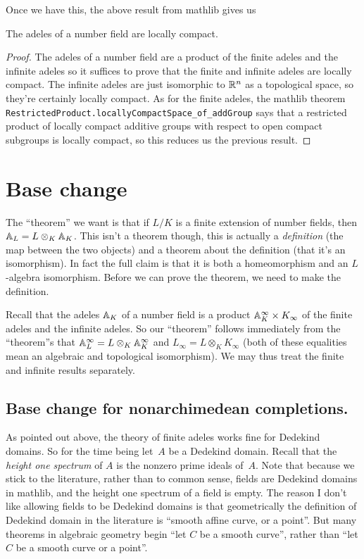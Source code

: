 Once we have this, the above result from mathlib gives us
\begin{theorem}
  \label{NumberField.AdeleRing.locallyCompactSpace}
  \leanok
  The adeles of a number field are locally compact.
\end{theorem}
\begin{proof}
  The adeles of a number field are a product of the finite adeles and the infinite adeles
  so it suffices to prove that the finite and infinite adeles are locally compact.
  The infinite adeles are just isomorphic to $\mathbb{R}^n$ as a topological space, so they're certainly
  locally compact. As for the finite adeles,
  the mathlib theorem {\tt RestrictedProduct.locallyCompactSpace\_of\_addGroup}
  says that a restricted product of locally compact additive groups with respect to open compact
  subgroups is locally compact, so this reduces us the previous result.
\end{proof}

\section{Base change}

The ``theorem'' we want is that if $L/K$ is a finite extension of number fields,
then $\mathbb{A}_L=L\otimes_K\mathbb{A}_K$. This isn't a theorem though, this is actually a \emph{definition}
(the map between the two objects) and a theorem about
the definition (that it's an isomorphism). In fact the full claim is that it is both a homeomorphism
and an $L$-algebra isomorphism. Before we can prove the theorem, we need to make the
definition.

Recall that the adeles $\mathbb{A}_K$ of a number field is a product $\mathbb{A}_K^\infty\times K_\infty$
of the finite adeles and the infinite adeles. So our ``theorem'' follows immediately from
the ``theorem''s that $\mathbb{A}_L^\infty=L\otimes_K\mathbb{A}_K^\infty$ and $L_\infty=L\otimes_KK_\infty$
(both of these equalities mean an algebraic and topological isomorphism).
We may thus treat the finite and infinite results separately.

\subsection{Base change for nonarchimedean completions.}

As pointed out above, the theory of finite adeles works fine for Dedekind domains.
So for the time being let~$A$ be a Dedekind domain. Recall that the \emph{height one spectrum}
of $A$ is the nonzero prime ideals of~$A$. Note that because we stick to the literature,
rather than to common sense, fields are Dedekind domains in mathlib, and the
height one spectrum of a field is empty. The reason I don't like allowing fields
to be Dedekind domains is that geometrically the definition of Dedekind
domain in the literature is ``smooth affine curve, or a point''. But many theorems in algebraic
geometry begin ``let $C$ be a smooth curve'', rather than ``let $C$ be a smooth curve or a point''.

